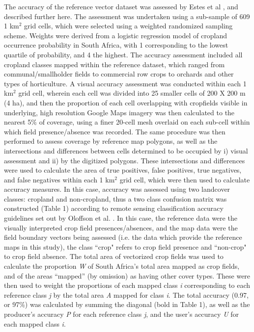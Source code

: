 \documentclass[11pt, titlepage]{article}
\begin{document}
The accuracy of the reference vector dataset was assessed by Estes et al \cite{estes_platform_2015}, and described further here. The assessment was undertaken using a sub-sample of 609 1 km$^2$ grid cells, which were selected using a weighted randomized sampling scheme. Weights were derived from a logistic regression model of cropland occurrence probability in South Africa, with 1 corresponding to the lowest quartile of probability, and 4 the highest. The accuracy assessment included all cropland classes mapped within the reference dataset, which ranged from communal/smallholder fields to commercial row crops to orchards and other types of horticulture. A visual accuracy assessment was conducted within each 1 km$^2$ grid cell, wherein each cell was divided into 25 smaller cells of 200 X 200 m (4 ha), and then the proportion of each cell overlapping with cropfields visible in underlying, high resolution Google Maps imagery was then calculated to the nearest 5\% of coverage, using a finer 20-cell mesh overlaid on each sub-cell within which field presence/absence was recorded. The same procedure was then performed to assess coverage by reference map polygons, as well as the intersections and differences between cells determined to be occupied by i) visual assessment and ii) by the digitized polygons. These intersections and differences were used to calculate the area of true positives, false positives, true negatives, and false negatives within each 1 km$^2$ grid cell, which were then used to calculate accuracy measures.  In this case, accuracy was assessed using two landcover classes: cropland and non-cropland, thus a two class confusion matrix was constructed (Table 1) according to remote sensing classification accuracy guidelines set out by Oloffson et al. \cite{olofsson_good_2014}. In this case, the reference data were the visually interpreted crop field presences/absences, and the map data were the field boundary vectors being assessed (i.e. the data which provide the reference maps in this study), the class ``crop" refers to crop field presence and ``non-crop" to crop field absence.  The total area of vectorized crop fields was used to calculate the proportion \emph{W} of South Africa's total area mapped as crop fields, and of the areas ``mapped'' (by omission) as having other cover types.  These were then used to weight the proportions of each mapped class \emph{i} corresponding to each reference class \emph{j} by the total area \emph{A} mapped for class \emph{i}. The total accuracy (0.97, or 97\%) was calculated by summing the diagonal (bold in Table 1), as well as the producer's accuracy \emph{P} for each reference class \emph{j}, and the user's accuracy \emph{U} for each mapped class \emph{i}.  
\end{document}
